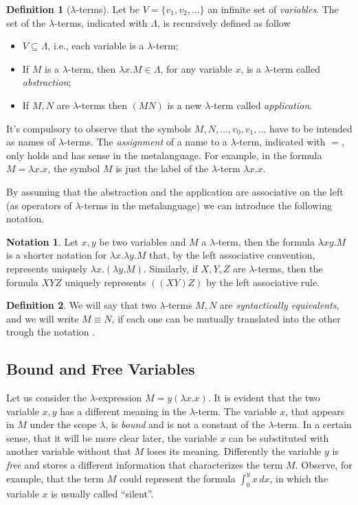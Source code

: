 \documentclass[a4paper,11pt]{article}
\theoremstyle{definition}
\newtheorem{defn}{Definition}
\newtheorem{notation}{Notation}
\begin{document}
\begin{defn}[$\lambda$-terms]
  Let be $V=\{v_1,v_2,\dots\}$ an infinite set of \textit{variables}. The
  set of the $\lambda$-terms, indicated with $\Lambda$, is recursively
  defined as follow
  \begin{itemize}
    \item $V\subseteq\Lambda$, i.e., each variable is a $\lambda$-term;
    \item If $M$ is a $\lambda$-term, then $\lambda x.M\in\Lambda$, for any variable
      $x$, is a $\lambda$-term called \textit{abstraction};
    \item If $M,N$ are $\lambda$-terms then $(MN)$ is a new $\lambda$-term
      called \textit{application}.
  \end{itemize}
\end{defn}

It's compulsory to observe that the symbols $M,N,\dots, v_0, v_1,\dots$ have
to be intended as names of $\lambda$-terms. The \textit{assignment} of a name
to a $\lambda$-term, indicated with $=$, only holds and has sense in the metalanguage. 
For example, in the formula $M=\lambda x.x$, the symbol $M$ is just the label 
of the $\lambda$-term $\lambda x.x$.

By assuming that the abstraction and the application are associative on the
left (as operators of $\lambda$-terms in the metalanguage) we can introduce
the following notation.
\begin{notation}
  \label{not:left}
  Let $x,y$ be two variables and $M$ a $\lambda$-term, then the formula
  $\lambda xy.M$ is a shorter notation for $\lambda x.\lambda y. M$ that, by
  the left associative convention, represents uniquely $\lambda x.(\lambda y.M)$.
  Similarly, if $X,Y,Z$ are $\lambda$-terms, then the formula $XYZ$ uniquely
  represents $((XY)Z)$ by the left associative rule.
\end{notation}

\begin{defn}
  We will say that two $\lambda$-terms $M,N$ are \textit{syntactically
  equivalents}, and we will write $M\equiv N$, if each one can be mutually
  translated into the other trough the notation .
\end{defn}
\subsection{Bound and Free Variables}
Let us consider the $\lambda$-expression $M=y(\lambda x.x)$. It is evident that
the two variable $x,y$ has a different meaning in the $\lambda$-term. The variable $x$, that 
appears in $M$ under the scope $\lambda$, is \textit{bound} and is not a constant of the 
$\lambda$-term. In a certain sense, that it will be more clear later, the
variable $x$ can be substituted with another variable without that $M$ loses
its meaning. Differently the variable $y$ is \textit{free} and stores a different information that
characterizes the term $M$. Observe, for example, that the term $M$ could represent the
formula $\int_0^y x\,dx$, in which the variable $x$ is usually called ``silent''.
\end{document}

